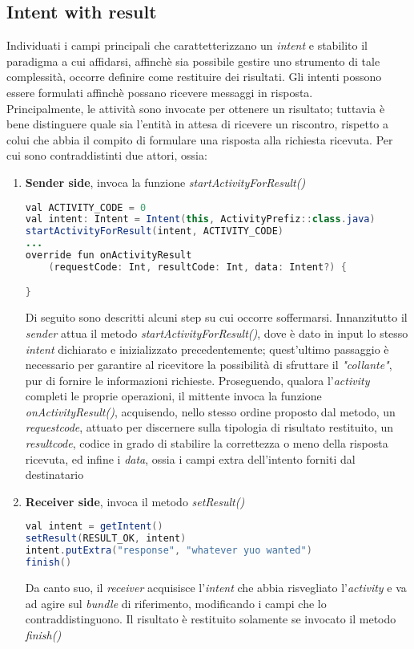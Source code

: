 \documentclass{article}
\begin{document}
\subsection*{Intent with result}
Individuati i campi principali che carattetterizzano un \textit{intent} e stabilito il paradigma a cui affidarsi, affinchè sia possibile gestire uno strumento di tale complessità, occorre definire come restituire dei risultati. Gli intenti possono essere formulati affinchè possano ricevere messaggi in risposta.\vspace*{7pt}\\
Principalmente, le attività sono invocate per ottenere un risultato; tuttavia è bene distinguere quale sia l'entità in attesa di ricevere un riscontro, rispetto a colui che abbia il compito di formulare una risposta alla richiesta ricevuta. Per cui sono contraddistinti due attori, ossia: 
\begin{enumerate}
    \itemsep0em
    \renewcommand{\labelenumi}{-}
    \item \textbf{Sender side}, invoca la funzione \textit{startActivityForResult()} 
    \begin{lstlisting}[language=JAVA, title=Sender acquisisce risultati da attività invocate]
val ACTIVITY_CODE = 0 
val intent: Intent = Intent(this, ActivityPrefiz::class.java)
startActivityForResult(intent, ACTIVITY_CODE)
...
override fun onActivityResult
    (requestCode: Int, resultCode: Int, data: Intent?) {

}
    \end{lstlisting}
    Di seguito sono descritti alcuni step su cui occorre soffermarsi. Innanzitutto il \textit{sender} attua il metodo \textit{startActivityForResult()}, dove è dato in input lo stesso \textit{intent} dichiarato e inizializzato precedentemente; quest'ultimo passaggio è necessario per garantire al ricevitore la possibilità di sfruttare il \textit{"collante"}, pur di fornire le informazioni richieste. Proseguendo, qualora l'\textit{activity} completi le proprie operazioni, il mittente invoca la funzione \textit{onActivityResult()}, acquisendo, nello stesso ordine proposto dal metodo, un \textit{requestcode}, attuato per discernere sulla tipologia di risultato restituito, un \textit{resultcode}, codice in grado di stabilire la correttezza o meno della risposta ricevuta, ed infine i \textit{data}, ossia i campi extra dell'intento forniti dal destinatario
    \item \textbf{Receiver side}, invoca il metodo \textit{setResult()}
    \begin{lstlisting}[language=JAVA, title=Receiver fornisce dati rispetto alla richiesta ricevuta]
val intent = getIntent()
setResult(RESULT_OK, intent)
intent.putExtra("response", "whatever yuo wanted")
finish()
    \end{lstlisting}
    Da canto suo, il \textit{receiver} acquisisce l'\textit{intent} che abbia risvegliato l'\textit{activity} e va ad agire sul \textit{bundle} di riferimento, modificando i campi che lo contraddistinguono. Il risultato è restituito solamente se invocato il metodo \textit{finish()}
\end{enumerate}
\end{document}
